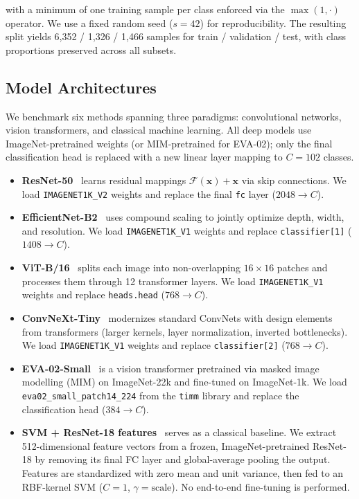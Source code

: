 with a minimum of one training sample per class enforced via the $\max(1, \cdot)$ operator. We use a fixed random seed ($s = 42$) for reproducibility. The resulting split yields 6{,}352 / 1{,}326 / 1{,}466 samples for train / validation / test, with class proportions preserved across all subsets.

\subsection{Model Architectures}

We benchmark six methods spanning three paradigms: convolutional networks, vision transformers, and classical machine learning. All deep models use ImageNet-pretrained weights (or MIM-pretrained for EVA-02); only the final classification head is replaced with a new linear layer mapping to $C = 102$ classes.

\begin{itemize}[nosep,leftmargin=*]
\item \textbf{ResNet-50}~\citep{he2016deep} learns residual mappings $\mathcal{F}(\mathbf{x}) + \mathbf{x}$ via skip connections. We load \texttt{IMAGENET1K\_V2} weights and replace the final \texttt{fc} layer ($2048 \to C$).

\item \textbf{EfficientNet-B2}~\citep{tan2019efficientnet} uses compound scaling to jointly optimize depth, width, and resolution. We load \texttt{IMAGENET1K\_V1} weights and replace \texttt{classifier[1]} ($1408 \to C$).

\item \textbf{ViT-B/16}~\citep{dosovitskiy2020image} splits each image into non-overlapping $16 \times 16$ patches and processes them through 12 transformer layers. We load \texttt{IMAGENET1K\_V1} weights and replace \texttt{heads.head} ($768 \to C$).

\item \textbf{ConvNeXt-Tiny}~\citep{liu2022convnet} modernizes standard ConvNets with design elements from transformers (larger kernels, layer normalization, inverted bottlenecks). We load \texttt{IMAGENET1K\_V1} weights and replace \texttt{classifier[2]} ($768 \to C$).

\item \textbf{EVA-02-Small}~\citep{fang2024eva} is a vision transformer pretrained via masked image modelling (MIM) on ImageNet-22k and fine-tuned on ImageNet-1k. We load \texttt{eva02\_small\_patch14\_224} from the \texttt{timm} library and replace the classification head ($384 \to C$).

\item \textbf{SVM + ResNet-18 features}~\citep{donahue2014decaf} serves as a classical baseline. We extract 512-dimensional feature vectors from a frozen, ImageNet-pretrained ResNet-18 by removing its final FC layer and global-average pooling the output. Features are standardized with zero mean and unit variance, then fed to an RBF-kernel SVM ($C = 1$, $\gamma = \text{scale}$). No end-to-end fine-tuning is performed.
\end{itemize}

